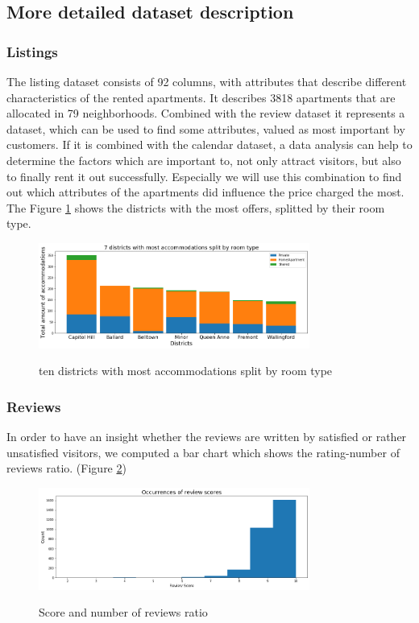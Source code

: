 \documentclass[journal]{IEEEtran}
\begin{document}
\subsection {More detailed dataset description}
\noindent \subsubsection{Listings}  The listing dataset consists of 92 columns, with attributes that describe different characteristics of the rented apartments. It describes 3818 apartments that are allocated in 79 neighborhoods. Combined with the review dataset it represents a dataset, which can be used to find some attributes, valued as most important by customers. If it is combined with the calendar dataset, a data analysis can help to determine the factors which are important to, not only attract visitors, but also to finally rent it out successfully. Especially we will use this combination to find out which attributes of the apartments did influence the price charged the most. The Figure \ref{districts_room_types} shows the districts with the most offers, splitted by their room type.
%
\begin{figure}
  \begin{center}
  \includegraphics[width=3.5in]{photo/4_most_acc_split_by_roomtype.png}\\
  \caption{ten districts with most accommodations split by room type}\label{districts_room_types}
  \end{center}
\end{figure}
\subsubsection{Reviews}
%
In order to have an insight whether the reviews are written by satisfied or rather unsatisfied visitors, we computed a bar chart which shows the rating-number of reviews ratio. (Figure \ref{score_reviews_ratio})
%
\begin{figure}
  \begin{center}
  \includegraphics[width=3.5in]{photo/2_1_occurences_of_review_scores.png}\\
  \caption{Score and number of reviews ratio}\label{score_reviews_ratio}
  \end{center}
\end{figure}
\end{document}
